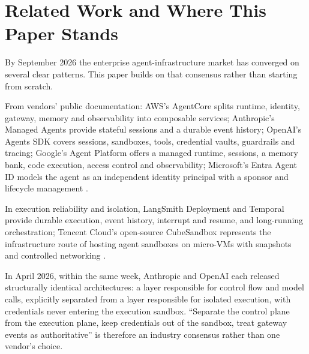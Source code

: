 \section{Related Work and Where This Paper Stands}
\label{sec:related}

By September 2026 the enterprise agent-infrastructure market has converged on several clear patterns. This paper builds on that consensus rather than starting from scratch.

From vendors' public documentation: AWS's AgentCore splits runtime, identity, gateway, memory and observability into composable services; Anthropic's Managed Agents provide stateful sessions and a durable event history; OpenAI's Agents SDK covers sessions, sandboxes, tools, credential vaults, guardrails and tracing; Google's Agent Platform offers a managed runtime, sessions, a memory bank, code execution, access control and observability; Microsoft's Entra Agent ID models the agent as an independent identity principal with a sponsor and lifecycle management \cite{aws-agentcore,anthropic-managed,openai-agents,google-agent-platform,entra-agent-id}.

In execution reliability and isolation, LangSmith Deployment and Temporal provide durable execution, event history, interrupt and resume, and long-running orchestration; Tencent Cloud's open-source CubeSandbox represents the infrastructure route of hosting agent sandboxes on micro-VMs with snapshots and controlled networking \cite{langsmith-deployment,temporal-durable,cube-sandbox}.

In April 2026, within the same week, Anthropic and OpenAI each released structurally identical architectures: a layer responsible for control flow and model calls, explicitly separated from a layer responsible for isolated execution, with credentials never entering the execution sandbox. ``Separate the control plane from the execution plane, keep credentials out of the sandbox, treat gateway events as authoritative'' is therefore an industry consensus rather than one vendor's choice.

